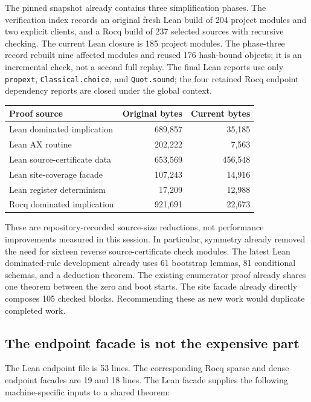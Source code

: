 \documentclass[11pt,letterpaper]{article}
\theoremstyle{definition}
\begin{document}
The pinned snapshot already contains three simplification phases. The
verification index records an original fresh Lean build of 204 project
modules and two explicit clients, and a Rocq build of 237 selected sources
with recursive checking. The current Lean closure is 185 project modules.
The phase-three record rebuilt nine affected modules and reused 176
hash-bound objects; it is an incremental check, not a second full replay.
The final Lean reports use only \texttt{propext},
\texttt{Classical.choice}, and \texttt{Quot.sound}; the four retained
Rocq endpoint dependency reports are closed under the global
context.\cite{verification,phase3}

\begin{center}
\begin{tabular}{@{}lrr@{}}
\toprule
Proof source & Original bytes & Current bytes\\
\midrule
Lean dominated implication & 689,857 & 35,185\\
Lean AX routine & 202,222 & 7,563\\
Lean source-certificate data & 653,569 & 456,548\\
Lean site-coverage facade & 107,243 & 14,916\\
Lean register determinism & 17,209 & 12,988\\
Rocq dominated implication & 921,691 & 22,673\\
\bottomrule
\end{tabular}
\end{center}

These are repository-recorded source-size reductions, not performance
improvements measured in this session. In particular, symmetry already
removed the need for sixteen reverse source-certificate check modules.
The latest Lean dominated-rule development already uses 61 bootstrap
lemmas, 81 conditional schemas, and a deduction theorem. The existing
enumerator proof already shares one theorem between the zero and boot
starts. The site facade already directly composes 105 checked blocks.
Recommending these as new work would duplicate completed work.

\subsection{The endpoint facade is not the expensive part}

The Lean endpoint file is 53 lines. The corresponding Rocq sparse and
dense endpoint facades are 19 and 18 lines. The Lean facade supplies the
following machine-specific inputs to a shared theorem:
\end{document}
